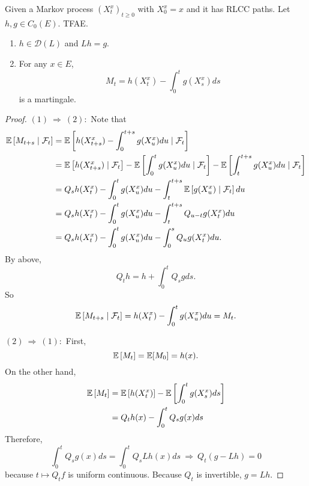 \begin{thm}\label{thm:martingale_markov}
    Given a Markov process $(X^x_t)_{t \geq 0}$ with $X_0^x = x$ and it has RLCC paths. Let $h ,g \in C_0(E)$. TFAE.
    \begin{enumerate}[label=(\arabic{*})]
        \item $h \in \mathcal{D}(L)$ and $Lh = g$.
        \item For any $x \in E$,
        \begin{equation*}
            M_t = h(X_t^x) - \int_0^t g(X_s^x)ds
        \end{equation*}
        is a martingale.
    \end{enumerate}
\end{thm}
\begin{proof}
    $(1)~\Rightarrow~(2):$ Note that
    \begin{align*}
        \mathbb{E}\left[M_{t+s} \mid \mathcal{F}_t\right] &= \mathbb{E}\left[h(X_{t+s}^x) - \int_0^{t+s} g(X_u^x)du \mid \mathcal{F}_t\right] \\
        &= \mathbb{E}\left[ h(X_{t+s}^x)  \mid \mathcal{F}_t \right] - \mathbb{E}\left[\int_0^t g(X_u^x)du \mid \mathcal{F}_t\right] - \mathbb{E}\left[\int_t^{t+s} g(X_u^x)du \mid \mathcal{F}_t\right] \\
        &= Q_sh(X_t^x) - \int_0^t g(X_u^x)du - \int_t^{t+s} \mathbb{E}\left[ g(X_u^x) \mid \mathcal{F}_t\right] du\\
        &= Q_sh(X_t^x) - \int_0^t g(X_u^x)du - \int_t^{t+s} Q_{u-t}g(X_t^x) du \\
        &= Q_sh(X_t^x) - \int_0^t g(X_u^x)du - \int_0^s Q_{u}g(X_t^x)du.
    \end{align*}
    By above,
    \begin{equation*}
        Q_t h = h + \int_0^t Q_sg ds.
    \end{equation*}
    So
    \begin{equation*}
         \mathbb{E}\left[M_{t+s} \mid \mathcal{F}_t\right] = h(X_t^x) - \int_0^t g(X_u^x)du = M_t. \qedhere
    \end{equation*}

    \noindent $(2) ~\Rightarrow~(1):$ First,
    \begin{equation*}
        \mathbb{E}\left[M_t\right] = \mathbb{E}[M_0] = h(x).
    \end{equation*}
    On the other hand,
    \begin{align*}
        \mathbb{E}\left[M_t\right] &= \mathbb{E}\left[h(X_t^x)\right] - \mathbb{E}\left[\int_0^t g(X_s^x)ds\right] \\
        &= Q_th(x) - \int_0^t Q_s g(x) ds 
    \end{align*}
    Therefore,
    \begin{equation*}
        \int_0^t Q_s g(x) ds = \int_0^t Q_s Lh(x)ds~\Rightarrow~ Q_t(g -Lh) = 0
    \end{equation*}
    because $t \mapsto Q_tf$ is uniform continuous. Because $Q_t$ is invertible, $g = Lh$.
\end{proof}

